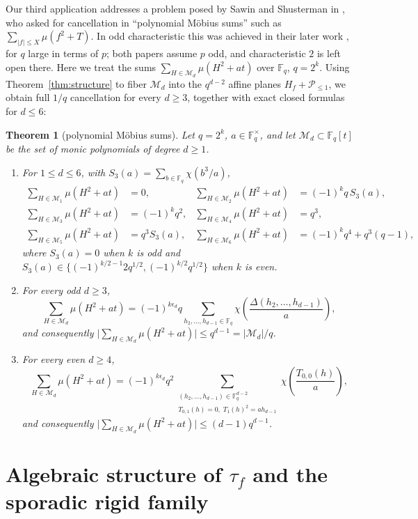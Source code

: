 \documentclass[11pt,a4paper]{amsart}
\newtheorem{theorem}{Theorem}[section]
\theoremstyle{remark}
\numberwithin{equation}{section}
\newcommand{\Fq}{\mathbb{F}_q}
\newcommand{\Pe}{\mathcal{P}}
\newcommand{\Me}{\mathcal{M}}
\begin{document}
Our third application addresses a problem posed by Sawin and Shusterman in \cite[\S1.5]{SS}, who asked for
cancellation in ``polynomial M\"obius sums'' such as $\sum_{|f|\le X}\mu(f^2+T)$. In odd characteristic this was
achieved in their later work \cite{SS2}, for $q$ large in terms of $p$; both papers assume $p$ odd, and
characteristic $2$ is left open there. Here we treat the sums $\sum_{H\in\Me_d}\mu(H^2+at)$ over $\Fq$, $q=2^k$. Using Theorem~\ref{thm:structure}
to fiber $\Me_d$ into the $q^{d-2}$ affine planes $H_f+\Pe_{\le 1}$, we obtain full $1/q$ cancellation for every
$d\ge 3$, together with exact closed formulas for $d\le 6$:

\begin{theorem}[polynomial M\"obius sums]\label{thm:poly-mobius}
Let $q=2^k$, $a\in\Fq^\times$, and let $\Me_d\subset\Fq[t]$ be the set of monic polynomials of degree $d\ge 1$.
\begin{enumerate}
\item[(a)] For $1\le d\le 6$, with $S_3(a)=\sum_{b\in\Fq}\chi(b^3/a)$,
\begin{align*}
\sum_{H\in\Me_1}\mu(H^2+at)&=0,&
\sum_{H\in\Me_2}\mu(H^2+at)&=(-1)^k q\,S_3(a),\\
\sum_{H\in\Me_3}\mu(H^2+at)&=(-1)^k q^2,&
\sum_{H\in\Me_4}\mu(H^2+at)&=q^3,\\
\sum_{H\in\Me_5}\mu(H^2+at)&=q^3S_3(a),&
\sum_{H\in\Me_6}\mu(H^2+at)&=(-1)^kq^4+q^3(q-1),
\end{align*}
where $S_3(a)=0$ when $k$ is odd and $S_3(a)\in\{(-1)^{k/2-1}2q^{1/2},(-1)^{k/2}q^{1/2}\}$ when $k$ is even.
\item[(b)] For every odd $d\ge 3$,
\[
\sum_{H\in\Me_d}\mu(H^2+at)=(-1)^{k\epsilon_d}q\sum_{h_2,\dots,h_{d-1}\in\Fq}
\chi\!\left(\frac{\Delta(h_2,\dots,h_{d-1})}{a}\right),
\]
and consequently $\bigl|\sum_{H\in\Me_d}\mu(H^2+at)\bigr|\le q^{d-1}=|\Me_d|/q$.
\item[(c)] For every even $d\ge 4$,
\[
\sum_{H\in\Me_d}\mu(H^2+at)=(-1)^{k\epsilon_d}q^2\sum_{\substack{(h_2,\dots,h_{d-1})\in\Fq^{d-2}\\
T_{0,1}(h)=0,\;T_1(h)^2=ah_{d-1}}}\chi\!\left(\frac{T_{0,0}(h)}{a}\right),
\]
and consequently $\bigl|\sum_{H\in\Me_d}\mu(H^2+at)\bigr|\le (d-1)q^{d-1}$.
\end{enumerate}
\end{theorem}

\section{Algebraic structure of \texorpdfstring{$\tau_f$}{tau\_f} and the sporadic rigid family}\label{sec:structure}
\end{document}

